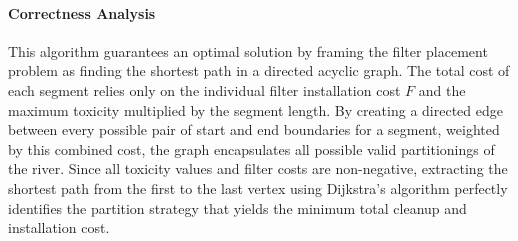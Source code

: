 \documentclass[11pt]{article}
\begin{document}
\paragraph{Correctness Analysis}
This algorithm guarantees an optimal solution by framing the filter placement problem as finding the shortest path in a directed acyclic graph. 
The total cost of each segment relies only on the individual filter installation cost $F$
 and the maximum toxicity multiplied by the segment length. 
 By creating a directed edge between every possible pair of start 
 and end boundaries for a segment, weighted by this combined cost, the graph encapsulates 
 all possible valid partitionings of the river. Since all toxicity values and 
 filter costs are non-negative, extracting the shortest path from the first to the last 
 vertex using Dijkstra's algorithm perfectly identifies the partition strategy that yields 
the minimum total cleanup and installation cost.
\end{document}
